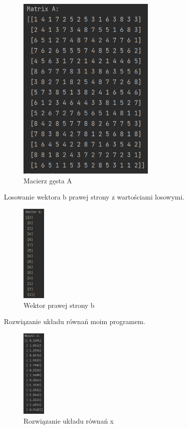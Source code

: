 \documentclass[9pt]{article}
\begin{document}
\begin{figure}[h]
  \centering
  \includegraphics[width=0.6\textwidth]{matrix_A_1.jpg}
  \caption{Macierz gęsta A}
\end{figure}
\newpage

Losowanie wektora b prawej strony z wartościami losowymi.

\begin{figure}[h]
  \centering
  \includegraphics[width=0.1\textwidth]{vector_B_1.jpg}
  \caption{Wektor prawej strony b}
\end{figure}
\newpage

Rozwiązanie układu równań moim programem.

\begin{figure}[h]
  \centering
  \includegraphics[width=0.1\textwidth]{result_x_1.jpg}
  \caption{Rozwiązanie układu równań x}
\end{figure}
\newpage
\end{document}
